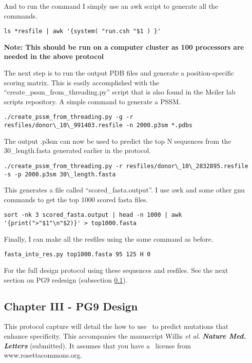 And to run the command I simply use an awk script to generate all the commands.

\begin{lstlisting}[breaklines=true]
ls *resfile | awk '{system( "run.csh "$1 ) }'
\end{lstlisting}

\textbf{Note: This should be run on a computer cluster as 100 processors are needed in the above protocol}

The next step is to run the output PDB files and generate a position-specific scoring matrix. This is easily accomplished with the ``create\_pssm\_from\_threading.py'' script that is also found in the Meiler lab scripts repository. A simple command to generate a PSSM.

\begin{lstlisting}[breaklines=true]
./create_pssm_from_threading.py -g -r resfiles/donor\_10\_991403.resfile -n 2000.p3sm *.pdbs
\end{lstlisting}

The output .p3sm can now be used to predict the top N sequences from the 30\_length.fasta generated earlier in the protocol.

\begin{lstlisting}[breaklines=true]
./create_pssm_from_threading.py -r resfiles/donor\_10\_2832895.resfile -s -p 2000.p3sm 30\_length.fasta
\end{lstlisting}

This generates a file called ``scored\_fasta.output''. I use awk and some other gnu commands to get the top 1000 scored fasta files.

\begin{lstlisting}[breaklines=true]
sort -nk 3 scored_fasta.output | head -n 1000 | awk '{print(">"$1"\n"$2)}' > top1000.fasta
\end{lstlisting}

Finally, I can make all the resfiles using the same command as before.

\begin{lstlisting}[breaklines=true]
fasta_into_res.py top1000.fasta 95 125 H 0
\end{lstlisting}

For the full design protocol using these sequences and resfiles. See the next section on PG9 redesign (subsection \ref{subsec:pg9redesign}).

\subsection{Chapter III - PG9 Design}
\label{subsec:pg9redesign}
\setlength{\parindent}{0cm}
This protocol capture will detail the how to use \rosettadesign~to predict mutations that enhance specificity. This accompanies the manuscript Willis \textit{et al.} \textbf{\textit{Nature Med. Letters}} (submitted). It assumes that you have a \rosetta~license from www.rosettacommons.org. \\

